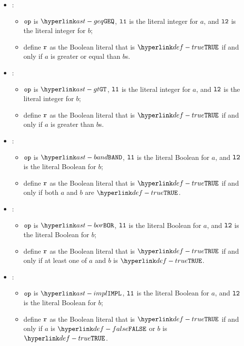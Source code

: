 \begin{itemize}
  \item {}:
  \begin{itemize}
    \item $\texttt{op}$ is $\GEQ$, $\texttt{l1}$ is the literal integer for $a$, and $\texttt{l2}$ is the literal integer for $b$;
    \item define $\texttt{r}$ as the Boolean literal that is $\True$ if and only if $a$ is greater or equal than $b$s.
  \end{itemize}

  \item {}:
  \begin{itemize}
    \item $\texttt{op}$ is $\GT$, $\texttt{l1}$ is the literal integer for $a$, and $\texttt{l2}$ is the literal integer for $b$;
    \item define $\texttt{r}$ as the Boolean literal that is $\True$ if and only if $a$ is greater than $b$s.
  \end{itemize}

  \item {}:
  \begin{itemize}
    \item $\texttt{op}$ is $\BAND$, $\texttt{l1}$ is the literal Boolean for $a$, and $\texttt{l2}$ is the literal Boolean for $b$;
    \item define $\texttt{r}$ as the Boolean literal that is $\True$ if and only if both $a$ and $b$ are $\True$.
  \end{itemize}

  \item {}:
  \begin{itemize}
    \item $\texttt{op}$ is $\BOR$, $\texttt{l1}$ is the literal Boolean for $a$, and $\texttt{l2}$ is the literal Boolean for $b$;
    \item define $\texttt{r}$ as the Boolean literal that is $\True$ if and only if at least one of $a$ and $b$ is $\True$.
  \end{itemize}

  \item {}:
  \begin{itemize}
    \item $\texttt{op}$ is $\IMPL$, $\texttt{l1}$ is the literal Boolean for $a$, and $\texttt{l2}$ is the literal Boolean for $b$;
    \item define $\texttt{r}$ as the Boolean literal that is $\True$ if and only if $a$ is $\False$ or $b$ is $\True$.
  \end{itemize}


\end{itemize}
